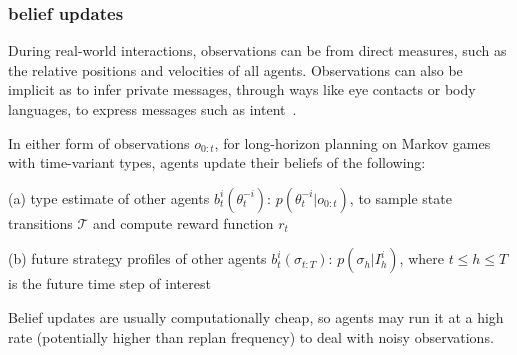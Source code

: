 \documentclass[letterpaper, 10 pt, conference]{ieeeconf}  %
\begin{document}
\subsubsection{belief updates}\label{sec:belief_update}
During real-world interactions, observations can be from direct measures, such as 
the relative positions and velocities of all agents. Observations can also 
be implicit as to infer private messages, through ways like eye contacts or body 
languages, to express messages such as intent~\cite{knepper2017implicit}.

In either form of observations $o_{0:t}$, for long-horizon planning on 
Markov games with time-variant types, agents 
update their beliefs of the following:

(a) type estimate of other agents $b^i_t(\theta_t^{-i})$: 
$p(\theta^{-i}_t|o_{0:t})$, to sample state transitions $\mathcal{T}$ and 
compute reward function $r_t$

(b) future strategy profiles of other agents $b^i_t(\sigma_{t:T})$: 
    $p(\sigma_h|I^i_h)$, where $t\leq h\leq T$ is the future time step of interest

Belief updates are usually computationally cheap, so agents may run it at a high 
rate (potentially higher than replan frequency) to deal with noisy 
observations. 
\end{document}
